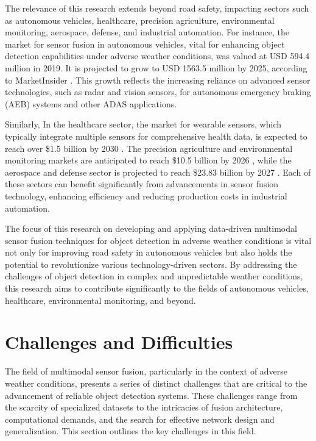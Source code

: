 \documentclass[report.tex]{subfiles}
\begin{document}
        The relevance of this research extends beyond road safety, impacting sectors such as autonomous vehicles, healthcare, precision agriculture, environmental monitoring, aerospace, defense, and industrial automation. For instance, the market for sensor fusion in autonomous vehicles, vital for enhancing object detection capabilities under adverse weather conditions, was valued at USD 594.4 million in 2019. It is projected to grow to USD 1563.5 million by 2025, according to MarketInsider \cite{marketInsider}. This growth reflects the increasing reliance on advanced sensor technologies, such as radar and vision sensors, for autonomous emergency braking (AEB) systems and other ADAS applications.
        
        Similarly, In the healthcare sector, the market for wearable sensors, which typically integrate multiple sensors for comprehensive health data, is expected to reach over \$1.5 billion by 2030 \cite{straitsresearch2021}. The precision agriculture and environmental monitoring markets are anticipated to reach \$10.5 billion by 2026 \cite{mordorintelligence2023}, while the aerospace and defense sector is projected to reach \$23.83 billion by 2027 \cite{fortunebusinessinsights2023}. Each of these sectors can benefit significantly from advancements in sensor fusion technology, enhancing efficiency and reducing production costs in industrial automation.
        
        The focus of this research on developing and applying data-driven multimodal sensor fusion techniques for object detection in adverse weather conditions is vital not only for improving road safety in autonomous vehicles but also holds the potential to revolutionize various technology-driven sectors. By addressing the challenges of object detection in complex and unpredictable weather conditions, this research aims to contribute significantly to the fields of autonomous vehicles, healthcare, environmental monitoring, and beyond.

    \section{Challenges and Difficulties}

        The field of multimodal sensor fusion, particularly in the context of adverse weather conditions, presents a series of distinct challenges that are critical to the advancement of reliable object detection systems. These challenges range from the scarcity of specialized datasets to the intricacies of fusion architecture, computational demands, and the search for effective network design and generalization. This section outlines the key challenges in this field.
\end{document}
